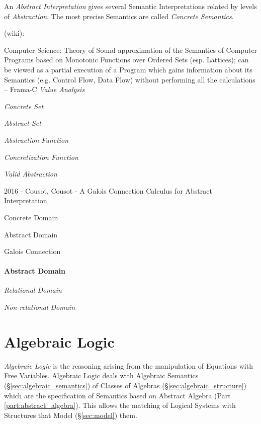 An \emph{Abstract Interpretation} gives several Semantic
Interpretations related by levels of \emph{Abstraction}. The most
precise Semantics are called \emph{Concrete Semantics}.

(wiki):

Computer Science: Theory of Sound approximation of the Semantics of
Computer Programs based on Monotonic Functions over Ordered Sets (esp.
Lattices); can be viewed as a partial execution of a Program which
gains information about its Semantics (e.g. Control Flow, Data Flow)
without performing all the calculations -- Frama-C \emph{Value
  Analysis}

\emph{Concrete Set}

\emph{Abstract Set}

\emph{Abstraction Function}

\emph{Concretization Function}

\emph{Valid Abstraction}

2016 - Cousot, Cousot - A Galois Connection Calculus for Abstract
Interpretation %

Concrete Domain

Abstract Domain

Galois Connection



\paragraph{Abstract Domain}\label{sec:abstract_domain}\hfill

\emph{Relational Domain}

\emph{Non-relational Domain}



\section{Algebraic Logic}\label{sec:algebraic_logic}

\emph{Algebraic Logic} is the reasoning arising from the manipulation of
Equations with Free Variables. Algebraic Logic deals with Algebraic Semantics
(\S\ref{sec:algebraic_semantics}) of Classes of Algebras
(\S\ref{sec:algebraic_structure}) which are the specification of Semantics
based on Abstract Algebra (Part \ref{part:abstract_algebra}). This allows the
matching of Logical Systems with Structures that Model (\S\ref{sec:model})
them.

